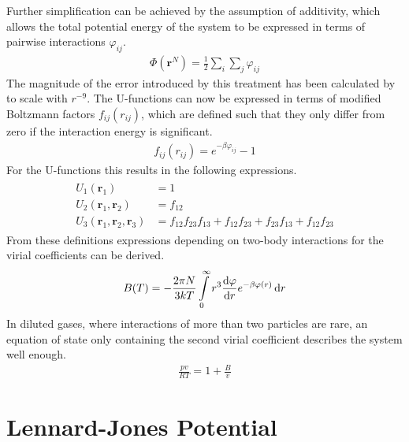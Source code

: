 Further simplification can be achieved by the assumption of additivity, which
allows the total potential energy of the system to be expressed in terms of
pairwise interactions $\varphi_{ij}$.
%
\begin{align}
    \Phi\left(\mathbf{r}^N\right)=\frac{1}{2}\sum_i\sum_j\varphi_{ij}
\end{align}
%
The magnitude of the error introduced by this treatment has been calculated by
\citeauthor{Axilrod_InteractionvanWaals_1943}\autocite{Axilrod_InteractionvanWaals_1943}
to scale with $r^{-9}$. The U-functions can now be expressed in terms of
modified Boltzmann factors $f_{ij}(r_{ij})$, which are defined such that they only differ from
zero if the interaction energy is significant.
%
\begin{align}
    f_{ij}(r_{ij})=e^{-\beta\varphi_{ij}}-1
\end{align}
%
For the U-functions this results in the following expressions.
%
\begin{align}
    \begin{aligned}
    U_1(\mathbf{r}_1)&=1\\
    U_2(\mathbf{r}_1,\mathbf{r}_2)&=f_{12}\\
    U_3(\mathbf{r}_1,\mathbf{r}_2,\mathbf{r}_3)&=f_{12}f_{23}f_{13}+f_{12}f_{23}+f_{23}f_{13}+f_{12}f_{23}
    \end{aligned}
\end{align}
%
From these definitions expressions depending on two-body interactions for the
virial coefficients can be derived.
%
\begin{align}
    B(T)=-\frac{2\pi N}{3kT}\int\limits_0^\infty r^3\dv{\varphi}{r}e^{-\beta\varphi(r)}\dd{r}
\end{align}
%
In diluted gases, where interactions of more than two particles are rare, an
equation of state only containing the second virial coefficient describes
the system well enough.
%
\begin{align}
    \frac{pv}{RT}=1+\frac{B}{v}
\end{align}
%

\section{Lennard-Jones Potential}
\label{sec:LennardJones}

